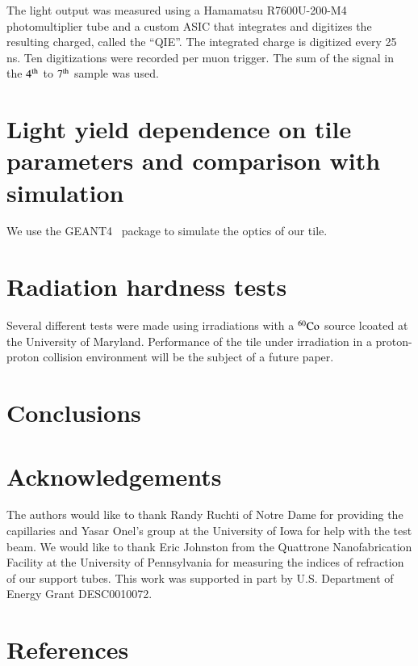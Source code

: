 \documentclass[review]{elsarticle}
\begin{document}
The light output was measured using a Hamamatsu R7600U-200-M4 photomultiplier tube and a custom ASIC that integrates and digitizes the resulting charged, called the ``QIE''\cite{qie}.  The integrated charge is digitized every 25 ns.  Ten digitizations were recorded per muon trigger.  The sum of the signal in the ${\rm 4^{th}}$ to ${\rm 7^{th}}$ sample was used.


\section{Light yield dependence on tile parameters and comparison with simulation}
We use the GEANT4~\cite{Agostinelli2003250} package to simulate the optics of our tile.  

\section{Radiation hardness tests}

Several different tests were made using irradiations with a $\rm{^{60}Co}$ source lcoated at the University of Maryland.  Performance of the tile under irradiation in a proton-proton collision environment will be the subject of a future paper.

\section{Conclusions}

\section{Acknowledgements}
The authors would like to thank Randy Ruchti of Notre Dame for providing the capillaries and Yasar Onel's group at the University of Iowa for help with the test beam.  We would like to thank Eric Johnston from the Quattrone Nanofabrication Facility  at the University of Pennsylvania for measuring the indices of refraction of our support tubes.
This work was supported in part by U.S. Department of Energy Grant DESC0010072.

\section*{References}


\end{document}
